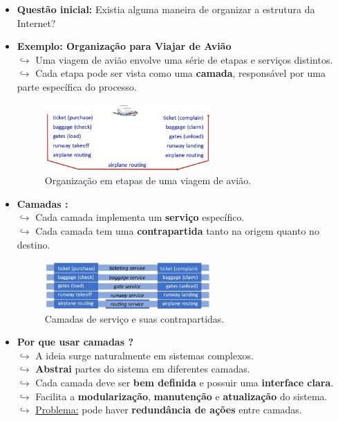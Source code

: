     \begin{itemize}
        \item \textbf{Questão inicial:} Existia alguma maneira de organizar a estrutura da Internet?

        \item \textbf{Exemplo: Organização para Viajar de Avião} \\
            $\hookrightarrow$ Uma viagem de avião envolve uma série de etapas e serviços distintos. \\
            $\hookrightarrow$ Cada etapa pode ser vista como uma \textbf{camada}, responsável por uma parte específica do processo.
        

        \begin{figure}[H]
            \centering
            \includegraphics[width=0.6\textwidth]{img/cap-01/exemplo-aviao.png}
            \caption{Organização em etapas de uma viagem de avião.}
        \end{figure}

        \item \textbf{Camadas :} \\ 
            $\hookrightarrow$ Cada camada implementa um \textbf{serviço} específico. \\
            $\hookrightarrow$ Cada camada tem uma \textbf{contrapartida} tanto na origem quanto no destino.
        
        \begin{figure}[H]
            \centering
            \includegraphics[width=0.6\textwidth]{img/cap-01/exemplo-aviao2.png}
            \caption{Camadas de serviço e suas contrapartidas.}
        \end{figure}

        \item \textbf{Por que usar camadas ?} \\
            $\hookrightarrow$ A ideia surge naturalmente em sistemas complexos. \\
            $\hookrightarrow$ \textbf{Abstrai} partes do sistema em diferentes camadas. \\
            $\hookrightarrow$ Cada camada deve ser \textbf{bem definida} e possuir uma \textbf{interface clara}. \\
            $\hookrightarrow$ Facilita a \textbf{modularização}, \textbf{manutenção} e \textbf{atualização} do sistema. \\
            $\hookrightarrow$ \underline{Problema:} pode haver \textbf{redundância de ações} entre camadas.


\end{itemize}
